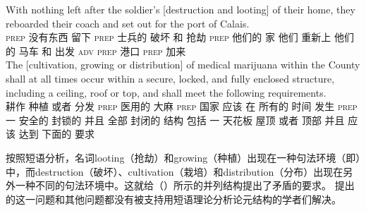 \eal
\ex 
\gll With nothing left after the soldier's [destruction and looting] of their home, they reboarded their coach and set out for the port of Calais.\\
    \textsc{prep} 没有东西 留下 \textsc{prep}  士兵的 \spacebr{}破坏 和 抢劫 \textsc{prep} 他们的 家 他们 重新上 他们的 马车 和 出发 \textsc{adv} \textsc{prep}  港口 \textsc{prep} 加来\\
\ex  
\gll The [cultivation, growing or distribution] of medical marijuana within the County shall at all times occur within a secure, locked, and fully enclosed structure, including a ceiling, roof or top, and shall meet the following requirements.\\
      耕作 种植 或者 分发 \textsc{prep} 医用的 大麻 \textsc{prep}  国家 应该 在 所有的 时间 发生 \textsc{prep} 一 安全的 封锁的 并且 全部 封闭的 结构 包括 一 天花板 屋顶 或者 顶部 并且 应该 达到  下面的 要求\\
\zl

    按照短语分析，名词looting（抢劫）和growing（种植）出现在一种句法环境（即\vPc ）中，而destruction（破坏）、cultivation（栽培）和distribution（分布）出现在另外一种不同的句法环境中。这就给（）所示的并列结构提出了矛盾的要求。 \citet{Wechsler2008a}提出的这一问题和其他问题都没有被支持用短语理论分析论元结构的学者们解决。


